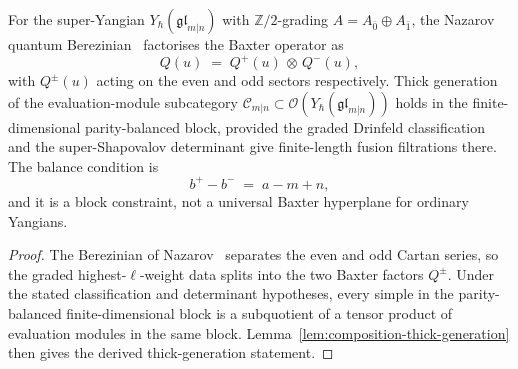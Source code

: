\begin{proposition}
\label{prop:mc3-super-parity-balance-five-family}
For the super-Yangian $Y_\hbar(\mathfrak{gl}_{m|n})$ with
$\mathbb{Z}/2$-grading $A = A_{\bar 0} \oplus A_{\bar 1}$, the Nazarov
quantum Berezinian~\cite{Nazarov91} factorises the Baxter operator as
\[
 Q(u) \;=\; Q^+(u)\,\otimes\,Q^-(u),
\]
with $Q^\pm(u)$ acting on the even and odd sectors respectively. Thick
generation of the evaluation-module subcategory
$\mathcal{C}_{m|n} \subset \mathcal{O}(Y_\hbar(\mathfrak{gl}_{m|n}))$
holds in the finite-dimensional parity-balanced block, provided the
graded Drinfeld classification and the super-Shapovalov determinant
give finite-length fusion filtrations there. The balance condition is
\[
 b^+ - b^- \;=\; a - m + n,
\]
and it is a block constraint, not a universal Baxter hyperplane for
ordinary Yangians.
\end{proposition}

\begin{proof}
The Berezinian of Nazarov~\cite{Nazarov91} separates the even and odd
Cartan series, so the graded highest-\(\ell\)-weight data splits into
the two Baxter factors \(Q^\pm\). Under the stated classification and
determinant hypotheses, every simple in the parity-balanced
finite-dimensional block is a subquotient of a tensor product of
evaluation modules in the same block. Lemma~\ref{lem:composition-thick-generation}
then gives the derived thick-generation statement.
\end{proof}


